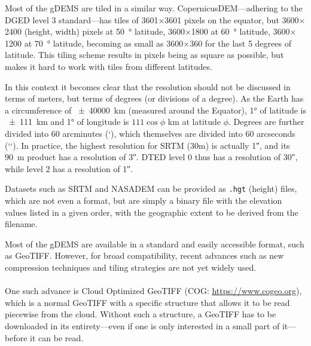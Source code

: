 %
Most of the gDEMS are tiled in a similar way.
CopernicusDEM---adhering to the DGED level 3 standard---has tiles of 3601$\times$3601 pixels on the equator, but 3600$\times$2400 (height, width) pixels at \qty{50}{\degree} latitude, 3600$\times$1800 at \qty{60}{\degree} latitude, 3600$\times$1200 at \qty{70}{\degree} latitude, becoming as small as 3600$\times$360 for the last 5 degrees of latitude.
This tiling scheme results in pixels being as square as possible, but makes it hard to work with tiles from different latitudes.

In this context it becomes clear that the resolution should not be discussed in terms of meters, but terms of degrees (or divisions of a degree).
As the Earth has a circumference of \qty{\pm40000}{km} (measured around the Equator), \ang{1} of latitude is \qty{\pm111}{km} and \ang{1} of longitude is $111\cos\phi$ \unit{km} at latitude $\phi$.
Degrees are further divided into 60 arcminutes (\lq), which themselves are divided into 60 arcseconds (\lq\lq).
In practice, the highest resolution for SRTM (30m) is actually \ang{;;1}, and its \qty{90}{m} product has a resolution of \ang{;;3}.
DTED level 0 thus has a resolution of \ang{;;30}, while level 2 has a resolution of \ang{;;1}.
%

Datasets such as SRTM and NASADEM can be provided as \texttt{.hgt} (height) files, which are not even a format, but are simply a binary file with the elevation values listed in a given order, with the geographic extent to be derived from the filename.


\begin{floatbox}
  \begin{kaobox-practice}[frametitle=\faCog\ Downloading gDEMs]
    Most of the gDEMS are available in a standard and easily accessible format, such as GeoTIFF\@.
    However, for broad compatibility, recent advances such as new compression techniques and tiling strategies are not yet widely used.
    \\ \\
    One such advance is Cloud Optimized GeoTIFF (COG: \url{https://www.cogeo.org}), which is a normal GeoTIFF with a specific structure that allows it to be read piecewise from the cloud.
    Without such a structure, a GeoTIFF has to be downloaded in its entirety---even if one is only interested in a small part of it---before it can be read.
  \end{kaobox-practice}
\end{floatbox}

